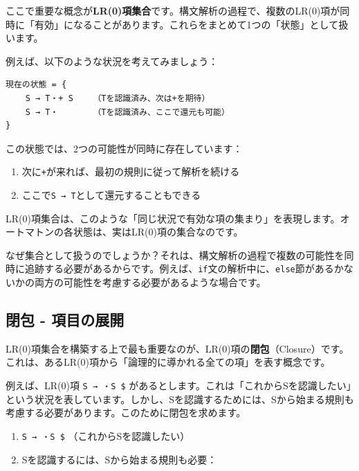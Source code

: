 ここで重要な概念が\textbf{LR(0)項集合}です。構文解析の過程で、複数のLR(0)項が同時に「有効」になることがあります。これらをまとめて1つの「状態」として扱います。

例えば、以下のような状況を考えてみましょう：

\begin{verbatim}
現在の状態 = {
    S → T・+ S    （Tを認識済み、次は+を期待）
    S → T・       （Tを認識済み、ここで還元も可能）
}
\end{verbatim}

この状態では、2つの可能性が同時に存在しています：

\begin{enumerate}
\def\labelenumi{\arabic{enumi}.}
\tightlist
\item
  次に\texttt{+}が来れば、最初の規則に従って解析を続ける
\item
  ここで\texttt{S\ →\ T}として還元することもできる
\end{enumerate}

LR(0)項集合は、このような「同じ状況で有効な項の集まり」を表現します。オートマトンの各状態は、実はLR(0)項の集合なのです。

なぜ集合として扱うのでしょうか？それは、構文解析の過程で複数の可能性を同時に追跡する必要があるからです。例えば、\texttt{if}文の解析中に、\texttt{else}節があるかないかの両方の可能性を考慮する必要があるような場合です。

\hypertarget{chapter5-ux9589ux5305---ux9805ux76eeux306eux5c55ux958b}{%
\subsection{閉包 -
項目の展開}\label{chapter5-ux9589ux5305---ux9805ux76eeux306eux5c55ux958b}}

LR(0)項集合を構築する上で最も重要なのが、LR(0)項の\textbf{閉包}（Closure）です。これは、あるLR(0)項から「論理的に導かれる全ての項」を表す概念です。

例えば、LR(0)項 \texttt{S\textquotesingle{}\ →\ ・S\ \$}
があるとします。これは「これからSを認識したい」という状況を表しています。しかし、Sを認識するためには、Sから始まる規則も考慮する必要があります。このために閉包を求めます。

\begin{enumerate}
\def\labelenumi{\arabic{enumi}.}
\tightlist
\item
  \texttt{S\textquotesingle{}\ →\ ・S\ \$} （これからSを認識したい）
\item
  Sを認識するには、Sから始まる規則も必要：
\end{enumerate}


